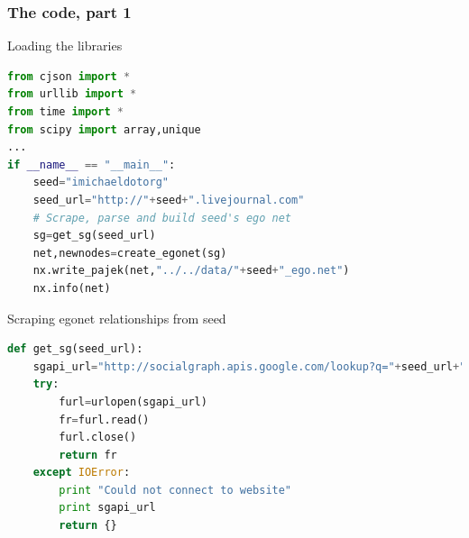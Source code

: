 \documentclass[xcolor=dvipsnames, 9pt]{beamer}
\begin{document}
\begin{frame}[fragile]
    \frametitle{The code, part 1}
        \begin{block}{\scriptsize{Loading the libraries}}
            \tiny{\begin{lstlisting}[language=Python]
from cjson import *
from urllib import *
from time import *
from scipy import array,unique
...
if __name__ == "__main__":
    seed="imichaeldotorg" 
    seed_url="http://"+seed+".livejournal.com"
    # Scrape, parse and build seed's ego net
    sg=get_sg(seed_url)
    net,newnodes=create_egonet(sg)
    nx.write_pajek(net,"../../data/"+seed+"_ego.net")
    nx.info(net)
                \end{lstlisting}}
            \end{block}
    \begin{block}{Scraping egonet relationships from seed}
        \tiny{\begin{lstlisting}[language=Python]
def get_sg(seed_url):
    sgapi_url="http://socialgraph.apis.google.com/lookup?q="+seed_url+"&edo=1&edi=1&fme=1&pretty=0"
    try:
        furl=urlopen(sgapi_url)
        fr=furl.read()
        furl.close()
        return fr
    except IOError:
        print "Could not connect to website"
        print sgapi_url
        return {}
        \end{lstlisting}}
    \end{block}    
\end{frame}
\end{document}

